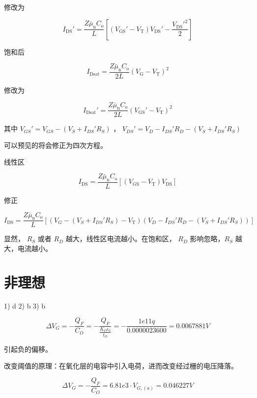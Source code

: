 \documentclass[lang=cn,11pt,a4paper,cite=authoryear]{elegantpaper}
\begin{document}
修改为

\[I_{\mathrm{DS}}'=\frac{Z \bar{\mu}_{\mathrm{n}} C_{\mathrm{o}}}{L}\left[\left(V_{\mathrm{GS}}'-V_{\mathrm{T}}\right) V_{\mathrm{DS}}'-\frac{V_{\mathrm{DS}}'^{2}}{2}\right]\]


饱和后

\[I_{\mathrm{Dsat}}=\frac{Z \bar{\mu}_{\mathrm{n}} C_{\mathrm{o}}}{2 L}\left(V_{\mathrm{G}}-V_{\mathrm{T}}\right)^{2}\]

修改为

\[I_{\mathrm{Dsat}}'=\frac{Z \bar{\mu}_{\mathrm{n}} C_{\mathrm{o}}}{2 L}\left(V_{\mathrm{GS}}'-V_{\mathrm{T}}\right)^{2}\]

其中 \(V_{GS}' = V_{GS} - (V_S + I_{DS}' R_S)\) ， \(V_{DS}' = V_D - I_{DS}' R_D  - (V_S + I_{DS}' R_S)\)

可以预见的将会修正为四次方程。


线性区


\[I_{\mathrm{DS}}=\frac{Z \bar{\mu}_{\mathrm{n}} C_{\mathrm{o}}}{L}\left[\left(V_{\mathrm{GS}}-V_{\mathrm{T}}\right) V_{\mathrm{DS}}\right]\]

修正 

\[I_{\mathrm{DS}}=\frac{Z \bar{\mu}_{\mathrm{n}} C_{\mathrm{o}}}{L}\left[\left(V_{G} - (V_S + I_{DS}' R_S)-V_{\mathrm{T}}\right)(  V_D - I_{DS}' R_D  - (V_S + I_{DS}' R_S))\right]\]

显然， \(R_S\) 或者 \(R_D\) 越大，线性区电流越小。在饱和区， \(R_D \) 影响忽略，\(R_S\) 越大，电流越小。

\part{非理想}


1) d 2) b 3) b 



\[\Delta V_G = - \frac{Q_F}{C_O} = -\frac{Q_F}{\frac{K_O \epsilon_0}{t_{O}}} = - \frac{1e11 q}{0.0000023600} = 0.0067881 V \]

引起负的偏移。

改变阈值的原理：在氧化层的电容中引入电荷，进而改变经过栅的电压降落。


\[\Delta V_G = - \frac{Q_F}{C_O} = 6.81 e3 \cdot V_{G,(a)} = 0.046227 V\]





\end{document}
